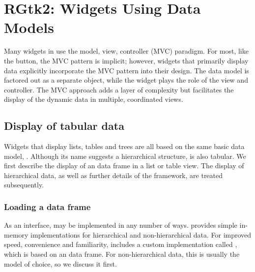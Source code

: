 
\chapter{RGtk2: Widgets Using Data Models}
\label{sec:RGtk2:widgets-with-models}



Many widgets in \GTK\/ use the model, view, controller (MVC)
paradigm. For most, like the button, the MVC pattern is implicit;
however, widgets that primarily display data explicitly incorporate
the MVC pattern into their design. The data model is factored out as a
separate object, while the widget plays the role of the view and
controller. The MVC approach adds a layer of complexity but
facilitates the display of the dynamic data in multiple, coordinated
views.

\section{Display of tabular data}
\label{sec:RGtk2:tabular-heirarchical-data}

Widgets that display lists, tables and trees are all based on the same
basic data model, . Although its name suggests a
hierarchical structure,  is also tabular. We first
describe the display of an \R\/ data frame in a list or table
view. The display of hierarchical data, as well as further details of
the  framework, are treated subsequently.

\subsection{Loading a data frame}
\label{sec:tabular-stores-tree}

As an interface,  may be implemented in any number
of ways. \GTK\/ provides simple in-memory implementations for
hierarchical and non-hierarchical data. For improved speed,
convenience and familiarity,  includes a custom
 implementation called , which
is based on an \R\/ data frame. For non-hierarchical data, this is
usually the model of choice, so we discuss it first.

